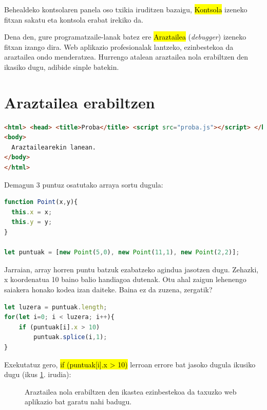 Behealdeko kontsolaren panela oso txikia iruditzen bazaigu, \hl{Kontsola} izeneko fitxan sakatu eta kontsola erabat irekiko da. 

Dena den, gure programatzaile-lanak batez ere \hl{Araztailea} (\textit{debugger}) izeneko fitxan izango dira. Web aplikazio profesionalak lantzeko, ezinbestekoa da araztailea ondo menderatzea. Hurrengo atalean araztailea nola erabiltzen den ikasiko dugu, adibide sinple batekin.

\section{Araztailea erabiltzen}

\begin{lstlisting}[language=HTML]
<html> <head> <title>Proba</title> <script src="proba.js"></script> </head>
<body>
  Araztailearekin lanean.
</body>
</html>
\end{lstlisting}


Demagun 3 puntuz osatutako arraya sortu dugula:

\begin{lstlisting}[language=JavaScript]
function Point(x,y){
  this.x = x;
  this.y = y;
}

let puntuak = [new Point(5,0), new Point(11,1), new Point(2,2)];

\end{lstlisting}

Jarraian, array horren puntu batzuk ezabatzeko agindua jasotzen dugu. Zehazki, x koordenatua 10 baino balio handiagoa dutenak. Otu ahal zaigun
lehenengo saiakera honako kodea izan daiteke. Baina ez da zuzena, zergatik?

\begin{lstlisting}[language=JavaScript]
let luzera = puntuak.length;
for(let i=0; i < luzera; i++){
    if (puntuak[i].x > 10)
        puntuak.splice(i,1);
}
\end{lstlisting}

Exekutatuz gero, \hl{if (puntuak[i].x > 10)} lerroan errore bat jasoko dugula ikusiko dugu (ikus \ref{fig:araztaile1}. irudia):

\begin{figure}[ht]
	\centering
{}
\caption{Araztailea nola erabiltzen den ikastea ezinbestekoa da taxuzko web aplikazio bat garatu nahi badugu.}
\label{fig:araztaile1}
\end{figure}

